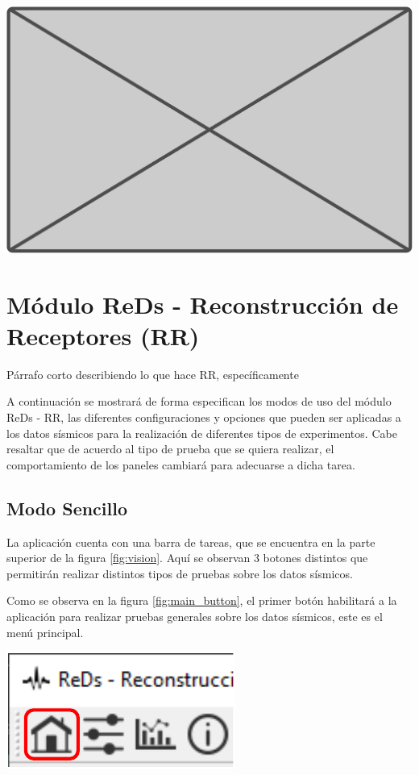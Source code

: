 \documentclass[12pt,twoside,letter]{ol-softwaremanual}
\newcommand*\circled[1]{\tikz[baseline=(char.base)]{
            \node[shape=circle,draw,inner sep=2pt] (char) {#1};}}
\newenvironment{Figure}
  {\par\medskip\noindent\minipage{\linewidth}}
  {\endminipage\par\medskip}
\begin{document}
\begin{Figure}
	\centering
	\includegraphics[width=0.75\linewidth]{figures/blank}
	\label{fig:rd}
\end{Figure}

\section{Módulo ReDs - Reconstrucción de Receptores (RR)}

{\color{red}Párrafo corto describiendo lo que hace RR, específicamente}

A continuación se mostrará de forma especifican los modos de uso del módulo ReDs - RR, las diferentes configuraciones y opciones que pueden ser aplicadas a los datos sísmicos para la realización de diferentes tipos de experimentos. Cabe resaltar que de acuerdo al tipo de prueba que se quiera realizar, el comportamiento de los paneles cambiará para adecuarse a dicha tarea.

\subsection{Modo Sencillo}

La aplicación cuenta con una barra de tareas, que se encuentra en la parte superior \circled{1} de la figura \ref{fig:vision}. Aquí se observan 3 botones distintos que permitirán realizar distintos tipos de pruebas sobre los datos sísmicos.

\begin{multicols}{2}

Como se observa en la figura \ref{fig:main_button}, el primer botón habilitará a la aplicación para realizar pruebas generales sobre los datos sísmicos, este es el menú principal.

\begin{Figure}
    \centering
    \includegraphics[width=0.4\linewidth]{single-tab}
    \label{fig:main_button}
\end{Figure}

\end{multicols}
\end{document}
